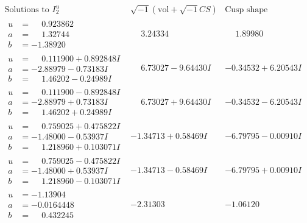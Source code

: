 \documentclass[1p]{elsarticle_modified}
\theoremstyle{definition}
\newcommand{\I}{\sqrt{-1}}
\begin{document}
$$\begin{array}{c|c|c}  
\text{Solutions to }I^u_{2}& \I (\text{vol} + \sqrt{-1}CS) & \text{Cusp shape}\\
 \hline 
\begin{aligned}
u &= \phantom{-}0.923862\phantom{ +0.000000I} \\
a &= \phantom{-}1.32744\phantom{ +0.000000I} \\
b &= -1.38920\phantom{ +0.000000I}\end{aligned}
 & \phantom{-}3.24334\phantom{ +0.000000I} & \phantom{-}1.89980\phantom{ +0.000000I} \\ \hline\begin{aligned}
u &= \phantom{-}0.111900 + 0.892848 I \\
a &= -2.88979 - 0.73183 I \\
b &= \phantom{-}1.46202 - 0.24989 I\end{aligned}
 & \phantom{-}6.73027 - 9.64430 I & -0.34532 + 6.20543 I \\ \hline\begin{aligned}
u &= \phantom{-}0.111900 - 0.892848 I \\
a &= -2.88979 + 0.73183 I \\
b &= \phantom{-}1.46202 + 0.24989 I\end{aligned}
 & \phantom{-}6.73027 + 9.64430 I & -0.34532 - 6.20543 I \\ \hline\begin{aligned}
u &= \phantom{-}0.759025 + 0.475822 I \\
a &= -1.48000 - 0.53937 I \\
b &= \phantom{-}1.218960 + 0.103071 I\end{aligned}
 & -1.34713 + 0.58469 I & -6.79795 - 0.00910 I \\ \hline\begin{aligned}
u &= \phantom{-}0.759025 - 0.475822 I \\
a &= -1.48000 + 0.53937 I \\
b &= \phantom{-}1.218960 - 0.103071 I\end{aligned}
 & -1.34713 - 0.58469 I & -6.79795 + 0.00910 I \\ \hline\begin{aligned}
u &= -1.13904\phantom{ +0.000000I} \\
a &= -0.0164448\phantom{ +0.000000I} \\
b &= \phantom{-}0.432245\phantom{ +0.000000I}\end{aligned}
 & -2.31303\phantom{ +0.000000I} & -1.06120\phantom{ +0.000000I} \\ \hline\begin{aligned}

\end{aligned}
\end{array}$$
\end{document}

